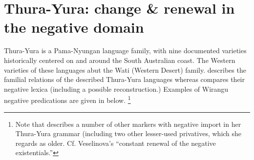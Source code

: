 \documentclass[output=paper]{langsci/langscibook}
\begin{document}
\section{Thura-Yura: change \& renewal in the negative domain}\label{sec:austr-3}

        Thura-Yura is a Pama-Nyungan language family, with nine documented
varieties historically centered on and around the South Australian
coast. The Western varieties of these languages abut the Wati
(Western Desert) family.  describes the
familial relations of the described Thura-Yura languages whereas
 compares their negative lexica (including a
        possible reconstruction.) Examples of Wirangu negative predications
are given in  below.%
\footnote{Note that \citep[57]{Hercus1999} describes a number of other
        markers with negative import in her Thura-Yura grammar (including
        two other lesser-used privatives, which she regards as older.
        Cf. Veselinova's \citeyearpar[173]{Veselinova2016}
        ``constant renewal of the negative existentials.''}
\end{document}
